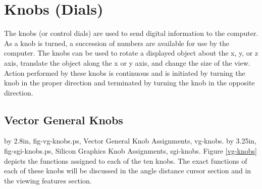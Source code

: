 
\section{Knobs (Dials)}

The knobs (or control dials) are used to send digital information
to the computer.
As a knob is turned, a succession of numbers are available for
use by the computer.
The knobs can be used to rotate a displayed object about the x, y, or z
axis, translate the object along the x or y axis, and change the size of the
view.  Action performed by these knobs is continuous and is initiated by
turning the knob in the proper direction and terminated by turning the knob
in the opposite direction.

\subsection{Vector General Knobs}

\PostScriptPicture 4.5in by 2.8in, fig-vg-knobs.ps, Vector General Knob Assignments, vg-knobs.
\PostScriptPicture 4.5in by 3.25in, fig-sgi-knobs.ps, Silicon Graphics Knob Assignments, sgi-knobs.
Figure \ref{vg-knobs} depicts the functions assigned to each of the ten knobs.
The exact functions of each of these knobs will be discussed in
the angle distance cursor section and in the viewing features section.

